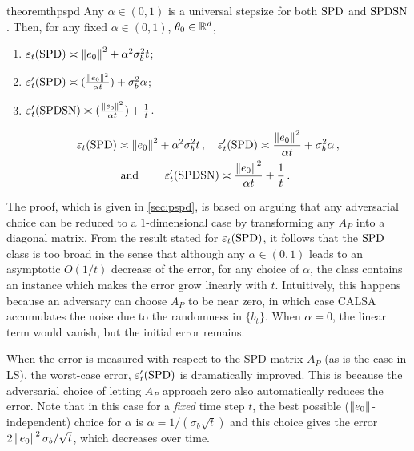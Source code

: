 \begin{restatable}{theorem}{thpspd}\label{th:pspd}
Any $\alpha\in(0,1)$ is a universal stepsize for
both $\mathrm{SPD}$ and $\mathrm{SPDSN}$.
Then, for any fixed $\alpha\in (0,1)$, $\theta_0\in \mathbb{R}^d$,
\begin{enumerate}[label=(\emph{\roman*}),
topsep=0pt,itemsep=1pt,wide, labelwidth=!, labelindent=0pt]
\item $\varepsilon_t(\mathrm{SPD}) \asymp
\left\| e_0\right\|^2+\alpha^2\sigma_b^2 t$;
\item $\varepsilon_t'(\mathrm{SPD}) \asymp (\frac{\left\| e_0\right\|^2}{\alpha t})+\sigma^2_b\alpha$;
\item $\varepsilon_t'(\mathrm{SPDSN}) \asymp (\frac{\left\| e_0\right\|^2}{\alpha t})+\frac{1}{t}$.
\end{enumerate}
\fi
\begin{align*}
\varepsilon_t(\mathrm{SPD}) &\asymp \left\| e_0\right\|^2+\alpha^2\sigma_b^2 t\,,\quad
\varepsilon_t'(\mathrm{SPD}) \asymp \frac{\left\| e_0\right\|^2}{\alpha t}+\sigma^2_b\alpha\,,\\
&\text{ and }\qquad \varepsilon_t'(\mathrm{SPDSN}) \asymp \frac{\left\| e_0\right\|^2}{\alpha t}+\frac{1}{t}\,.
\end{align*}
\end{restatable}
The proof, which is given in \cref{sec:pspd}, is based on arguing that any adversarial choice can be reduced to a $1$-dimensional case by transforming any $A_P$ into a diagonal matrix.
\fi
From the result stated for $\varepsilon_t(\mathrm{SPD})$, 
it follows that the $\mathrm{SPD}$ class is too broad in the sense that although any $\alpha\in (0,1)$ leads to an asymptotic $O(1/t)$ decrease of the error, for any choice of $\alpha$, the class contains an instance which makes the error grow linearly with $t$. Intuitively, this happens because an adversary can choose $A_P$ to be near zero, in which case CALSA accumulates the noise due to the randomness in $\{b_t\}$. When $\alpha=0$, the linear term would vanish, but the initial error remains. 

When the error is measured with respect to the SPD matrix $A_P$ (as is the case in LS), the worst-case error, $\varepsilon_t'(\mathrm{SPD})$ is dramatically improved. This is because the adversarial choice of letting $A_P$ approach zero also
automatically reduces the error. Note that in this case for a \emph{fixed} time step $t$, the best possible ($\left\| e_0\right\|$-independent)
choice for $\alpha$ is $\alpha = 1/(\sigma_b \sqrt{t})$ and this choice 
gives the error $2\left\| e_0\right\|^2 \sigma_b/\sqrt{t}$, which decreases over time.

